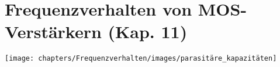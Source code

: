 
\section{Frequenzverhalten von MOS-Verstärkern (Kap. 11)}
\texttt{[image: chapters/Frequenzverhalten/images/parasitäre\_kapazitäten]}
